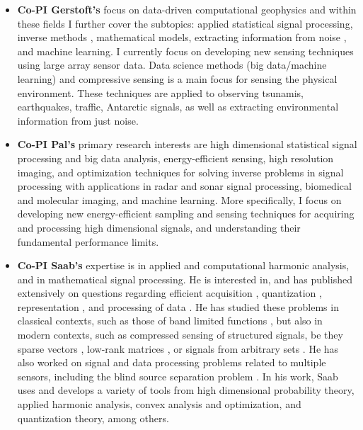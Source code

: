 \documentclass{article}
\begin{document}
\begin{itemize}
\item {\bf Co-PI Gerstoft's} focus on data-driven computational geophysics and within these fields I further cover the subtopics: applied statistical signal processing, inverse methods \cite{gerstoft1994}, mathematical models, extracting information from noise \cite{sabra2005,gerstoft2006}, and machine learning\cite{niu2017source,kong2018}. I currently focus on developing new sensing techniques using large array sensor data. Data science methods (big data/machine learning) and compressive sensing\cite{XenakiCS:2014,Gerstoft2015} is a main focus for sensing the physical environment.  These techniques are applied to observing tsunamis, earthquakes, traffic, Antarctic signals, as well as extracting environmental information from just noise. 
\item {\bf Co-PI Pal's}  primary research interests are high dimensional statistical signal processing and big data analysis, energy-efficient sensing, high resolution imaging, and optimization techniques for solving inverse problems in signal processing with applications in radar and sonar signal processing, biomedical and molecular imaging, and machine learning. More specifically, I focus on developing new energy-efficient sampling and sensing techniques for acquiring and processing high dimensional signals, and understanding their fundamental performance limits. 
\item {\bf Co-PI Saab's} expertise is in applied and computational harmonic analysis, and in mathematical signal processing. He is interested in, and has published extensively on questions regarding efficient acquisition \cite{saab2008stable, friedlander2012recovering}, quantization \cite{knudson2016one, saab2018quantization, SaabIEEEIT}, representation \cite{huynh2018fast}, and processing of data \cite{wang2008bayesian}. He has studied these problems in classical contexts, such as those of band limited functions \cite{daubechies2015deterministic}, but also in modern contexts, such as compressed sensing of structured signals, be they sparse vectors \cite{gunturk2013sobolev}, low-rank matrices \cite{LybrandSaab2018}, or signals from arbitrary sets \cite{huynh2018fast,iwen2019new}. He has also worked on signal and data processing problems related to multiple sensors, including the blind source separation problem \cite{wang2008bayesian, saab2007underdetermined}. In his work, Saab uses and develops a variety of tools from high dimensional probability theory, applied harmonic analysis, convex analysis and optimization, and quantization theory, among others. 
\end{itemize}
\vspace{1cm}
\end{document}
